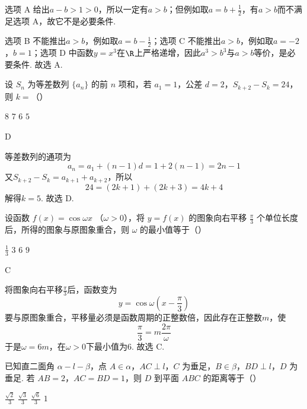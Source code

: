 \begin{solution}
选项 A 给出\(a-b>1>0\)，所以一定有\(a>b\)；但例如取\(a=b+\frac12\)，有\(a>b\)而不满足选项 A，故它不是必要条件.

选项 B 不能推出\(a>b\)，例如取\(a=b-\frac12\)；选项 C 不能推出\(a>b\)，例如取\(a=-2\)，\(b=1\)；选项 D 中函数\(y=x^3\)在\(\R\)上严格递增，因此\(a^3>b^3\)与\(a>b\)等价，是必要条件.
故选 A.
\end{solution}


\begin{problem}
设 \(S_{n}\) 为等差数列 \(\{a_{n}\}\) 的前 \(n\) 项和，若 \(a_{1} = 1\)，公差 \(d = 2\)，\(S_{k+2} - S_{k} = 24\)，则 \(k =\)（\quad）

\choices
    {\(8\)}
    {\(7\)}
    {\(6\)}
    {\(5\)}
\end{problem}

\begin{answer}
D
\end{answer}

\begin{solution}
等差数列的通项为
\[
a_n=a_1+(n-1)d=1+2(n-1)=2n-1
\]
又\(S_{k+2}-S_k=a_{k+1}+a_{k+2}\)，所以
\[
24=(2k+1)+(2k+3)=4k+4
\]
解得\(k=5\).
故选 D.
\end{solution}


\begin{problem}
设函数 \( f(x) = \cos \omega x  \) （\(\omega > 0\)），将 \( y = f(x) \) 的图象向右平移 \( \frac{\pi}{3} \) 个单位长度后，所得的图象与原图象重合，则 \( \omega \) 的最小值等于（\quad）

\choices
    {\( \frac{1}{3} \)}
    {\(3\)}
    {\(6\)}
    {\(9\)}
\end{problem}

\begin{answer}
C
\end{answer}

\begin{solution}
将图象向右平移\(\frac{\pi}{3}\)后，函数变为
\[
y=\cos\omega\left(x-\frac{\pi}{3}\right)
\]
要与原图象重合，平移量必须是函数周期的正整数倍，因此存在正整数\(m\)，使
\[
\frac{\pi}{3}=m\frac{2\pi}{\omega}
\]
于是\(\omega=6m\)，在\(\omega>0\)下最小值为\(6\).
故选 C.
\end{solution}


\begin{problem}
已知直二面角 \(\alpha - l - \beta\)，点 \(A \in \alpha\)，\(AC \perp l\)，\(C\) 为垂足，\(B \in \beta\)，\(BD \perp l\)，\(D\) 为垂足. 若 \(AB = 2\)，\(AC = BD = 1\)，则 \(D\) 到平面 \(ABC\) 的距离等于（\quad）

\choices
    {\(\frac{\sqrt{2}}{3}\)}
    {\(\frac{\sqrt{3}}{3}\)}
    {\(\frac{\sqrt{6}}{3}\)}
    {\(1\)}
\end{problem}

